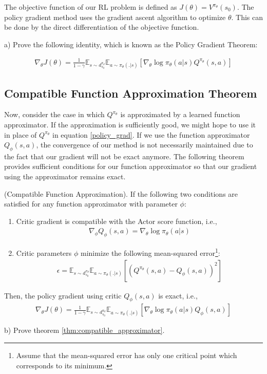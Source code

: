 The objective function of our RL problem is defined as $J(\theta) = V^{\pi_\theta}(s_0)$. The policy gradient method uses the gradient ascent algorithm to optimize $\theta$. This can be done by the direct differentiation of the objective function.

a) Prove the following identity, which is known as the Policy Gradient Theorem:

\begin{align}\label{policy_grad}
    \nabla_\theta J(\theta) = \frac{1}{1-\gamma}\mathbb{E}_{s \sim d^{\pi_\theta}_{s_0}}\mathbb{E}_{a \sim \pi_\theta(.|s)} [\nabla_\theta \log \pi_\theta (a|s) Q^{\pi_\theta} (s, a)]
\end{align}


\subsection{Compatible Function Approximation Theorem}

Now, consider the case in which $Q^{\pi_\theta}$ is approximated by a learned function approximator. If the approximation is sufficiently good, we might hope to use it in place of $Q^{\pi_\theta}$ in equation \ref{policy_grad}. If we use the function approximator $Q_{\phi}(s, a)$, the convergence of our method is not necessarily maintained due to the fact that our gradient will not be exact anymore. The following theorem provides sufficient conditions for our function approximator so that our gradient using the approximator remains exact.

\begin{theorem}\label{thm:compatible_approximator}
    (Compatible Function Approximation). If the following two conditions are satisfied for any function approximator with parameter $\phi$:
    \begin{enumerate}
        \item Critic gradient is compatible with the Actor score function, i.e., 
        \begin{align*}
            \nabla_{\phi} Q_\phi(s, a) = \nabla_\theta \log \pi_\theta (a|s)
        \end{align*}
        \item Critic parameters $\phi$ minimize the following mean-squared error\footnote{Assume that the mean-squared error has only one critical point which corresponds to its minimum.}: 
        \begin{align*}
            \epsilon = \mathbb{E}_{s \sim d^{\pi_\theta}_{s_0}}\mathbb{E}_{a \sim \pi_\theta(.|s)} [(Q^{\pi_\theta} (s, a) - Q_\phi(s, a))^2]
        \end{align*}
    \end{enumerate}
    Then, the policy gradient using critic $Q_\phi(s, a)$ is exact, i.e., 
    \begin{align*}
            \nabla_\theta J(\theta) = \frac{1}{1-\gamma}\mathbb{E}_{s \sim d^{\pi_\theta}_{s_0}}\mathbb{E}_{a \sim \pi_\theta(.|s)} [\nabla_\theta \log \pi_\theta (a|s) Q_\phi (s, a)]
    \end{align*}
\end{theorem}

b) Prove theorem \ref{thm:compatible_approximator}.